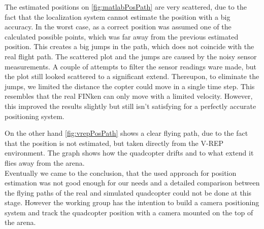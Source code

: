 The estimated positions on \ref{fig:matlabPosPath} are very scattered, due to the fact that the localization system cannot estimate the position with a big accuracy. 
In the worst case, as a correct position was assumed one of the calculated possible points, which was far away from the previous estimated position. 
This creates a big jumps in the path, which does not coincide with the real flight path. 
The scattered plot and the jumps are caused by the noisy sensor measurements. 
A couple of attempts to filter the sensor readings ware made, but the plot still looked scattered to a significant extend. 
Thereupon, to eliminate the jumps, we limited the distance the copter could move in a single time step.
This resembles that the real FINken can only move with a limited velocity.
However, this improved the results slightly but still isn't satisfying for a perfectly accurate positioning system.


On the other hand \ref{fig:vrepPosPath} shows a clear flying path, due to the fact that the position is not estimated, but taken directly from the V-REP environment. 
The graph shows how the quadcopter drifts and to what extend it flies away from the arena.\\

Eventually we came to the conclusion, that the used approach for position estimation was not good enough for our needs and a detailed comparison between the flying paths of the real and simulated quadcopter could not be done at this stage. 
However the working group has the intention to build a camera positioning system and track the quadcopter position with a camera mounted on the top of the arena.


